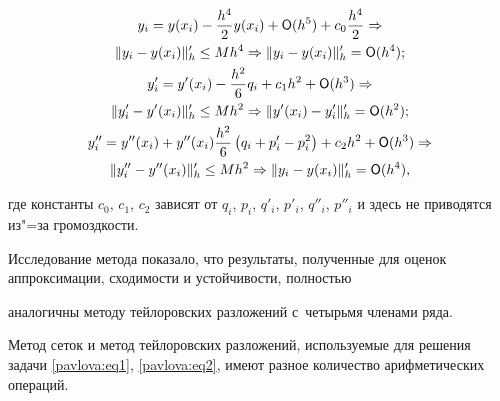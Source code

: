 \begin{gather*}

y_i =y(x_i )-\frac{h^4}{2}y(x_i )+{\sf O}(h^5)+c_0 \frac{h^4}{2}\Rightarrow \\

\| y_i -y(x_i)\|'_h \le Mh^4\Rightarrow  \| y_i -y(x_i)\|'_h ={\sf O}(h^4);\\

y'_i =y'(x_i)-\frac{h^2}{6}q_i +c_1 h^2+{\sf O}(h^3)\Rightarrow \\ \| y'_i -y'(x_i )\|'_h \le Mh^2\Rightarrow  \| y'(x_i )-y'_i \|'_h ={\sf O}(h^2);\\

y''_i =y''(x_i)+y''(x_i)\frac{h^2}{6} \left(q_i +p'_i -p_i^2 \right)+c_2 h^2+{\sf O}(h^3)\Rightarrow \\ 

\| y''_i -y''(x_i )\|'_h \le Mh^2\Rightarrow  \| y_i -y(x_i )\|'_h ={\sf O}(h^4),

\end{gather*}

где константы $c_0$, $c_1$, $c_2$ зависят от $q_i$, $p_i$, $q'_i$, $p'_i$, $q''_i$, $p''_i$ и здесь не приводятся из"=за громоздкости.



Исследование метода показало, что результаты, полученные для оценок аппроксимации, сходимости и устойчивости, полностью

аналогичны методу тейлоровских разложений с~четырьмя членами ряда.



\smallskip




Метод сеток и метод тейлоровских разложений, используемые для решения задачи \eqref{pavlova:eq1}, \eqref{pavlova:eq2}, имеют разное количество арифметических операций. 




%



